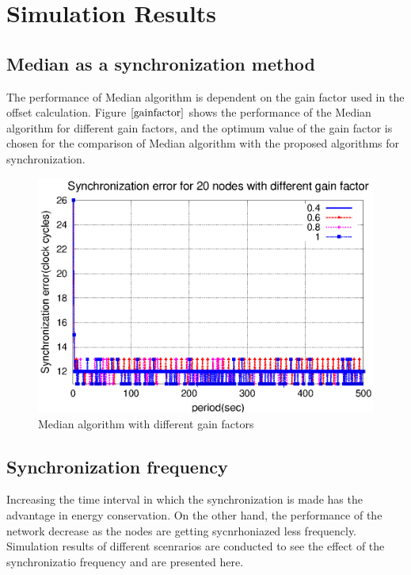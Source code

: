 \documentclass[a4paper,10pt]{report}
\begin{document}
\chapter{Simulation Results}
\section{\textbf{Median as a synchronization method}}
The performance of Median algorithm is dependent on the gain factor used in the offset calculation. Figure $\ref{gainfactor}$ shows the performance of the Median algorithm for different gain factors, and the optimum value of the gain factor is chosen for the comparison of Median algorithm with the proposed algorithms for synchronization.
\begin{figure}[!h]
\centering
\includegraphics[width= 0.7 \textwidth]{gainfactor}
\caption{Median algorithm with different gain factors} \label{gainfactor}
\end{figure}
\section{\textbf{Synchronization frequency}}
Increasing the time interval in which the synchronization is made has the advantage in energy conservation. On the other hand, the performance of the network decrease as the nodes are getting sycnrhoniazed less frequencly. Simulation results of different scenrarios are conducted to see the effect of the synchronizatio frequency and are presented here.
\end{document}
